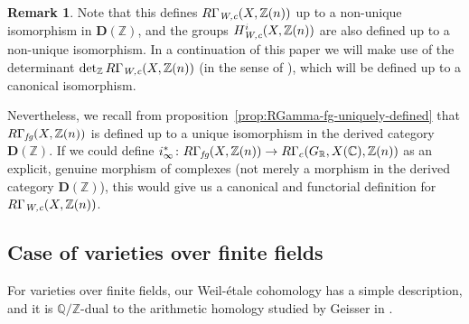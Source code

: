 \documentclass[leqno,12pt]{article}
\theoremstyle{plain}
\theoremstyle{definition}
\newtheorem{remark}[theorem]{\indent\sc Remark}
\newcommand{\ZZ}{\mathbb{Z}}
\newcommand{\QQ}{\mathbb{Q}}
\newcommand{\RR}{\mathbb{R}}
\newcommand{\CC}{\mathbb{C}}
\newcommand{\Wc}{\text{\it W,c}}
\newcommand{\fg}{\text{\it fg}}
\begin{document}
\begin{remark}
  Note that this defines $R\Gamma_\Wc (X,\ZZ(n))$ up to a non-unique isomorphism
  in $\mathbf{D} (\ZZ)$, and the groups $H_\Wc^i (X, \ZZ (n))$ are also defined
  up to a non-unique isomorphism. In a continuation of this paper we will make
  use of the determinant $\det\nolimits_\ZZ R\Gamma_\Wc (X,\ZZ(n))$ (in the
  sense of \cite{Knudsen-Mumford-1976}), which will be defined up to a canonical
  isomorphism.

  Nevertheless, we recall from proposition~\ref{prop:RGamma-fg-uniquely-defined}
  that $R\Gamma_\fg (X, \ZZ (n))$ is defined up to a unique isomorphism in the
  derived category $\mathbf{D} (\ZZ)$. If we could define
  $i_\infty^*\colon R\Gamma_\fg (X, \ZZ(n)) \to R\Gamma_c (G_\RR, X(\CC), \ZZ(n))$
  as an explicit, genuine morphism of complexes (not merely a morphism in the
  derived category $\mathbf{D} (\ZZ)$), this would give us a canonical and
  functorial definition for $R\Gamma_\Wc (X, \ZZ(n))$.
\end{remark}

\subsection*{Case of varieties over finite fields}

For varieties over finite fields, our Weil-\'{e}tale cohomology has a simple
description, and it is $\QQ/\ZZ$-dual to the arithmetic homology studied by
Geisser in \cite{Geisser-2010-arithmetic-homology}.
\end{document}
